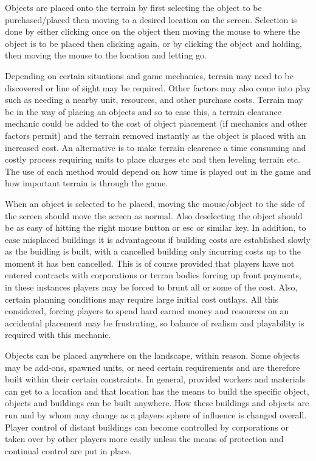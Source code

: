 Objects are placed onto the terrain by first selecting the object to be purchased/placed then moving to a desired location on the screen. Selection is done by either clicking once on the object then moving the mouse to where the object is to be placed then clicking again, or by clicking the object and holding, then moving the mouse to the location and letting go.

Depending on certain situations and game mechanics, terrain may need to be discovered or line of sight may be required. Other factors may also come into play such as needing a nearby unit, resources, and other purchase costs. Terrain may be in the way of placing an objects and so to ease this, a terrain clearance mechanic could be added to the cost of object placement (if mechanics and other factors permit) and the terrain removed instantly as the object is placed with an increased cost. An alternative is to make terrain clearence a time consuming and costly process requiring units to place charges etc and then leveling terrain etc. The use of each method would depend on how time is played out in the game and how important terrain is through the game.

When an object is selected to be placed, moving the mouse/object to the side of the screen should move the screen as normal. Also deselecting the object should be as easy of hitting the right mouse button or esc or similar key. In addition, to ease misplaced buildings it is advantageous if building costs are established slowly as the buidling is built, with a cancelled building only incurring costs up to the moment it has ben cancelled. This is of course provided that players have not entered contracts with corporations or terran bodies forcing up front payments, in these instances players may be forced to brunt all or some of the cost. Also, certain planning conditions may require large initial cost outlays. All this considered, forcing players to spend hard earned money and resources on an accidental placement may be frustrating, so balance of realism and playability is required with this mechanic.

Objects can be placed anywhere on the landscape, within reason. Some objects may be add-ons, spawned units, or need certain requirements and are therefore built within their certain constraints. In general, provided workers and materials can get to a location and that location has the means to build the specific object, objects and buildings can be built anywhere. How these buildings and objects are run and by whom may change as a players sphere of influence is changed overall. Player control of distant buildings can become controlled by corporations or taken over by other players more easily unless the means of protection and continual control are put in place.



